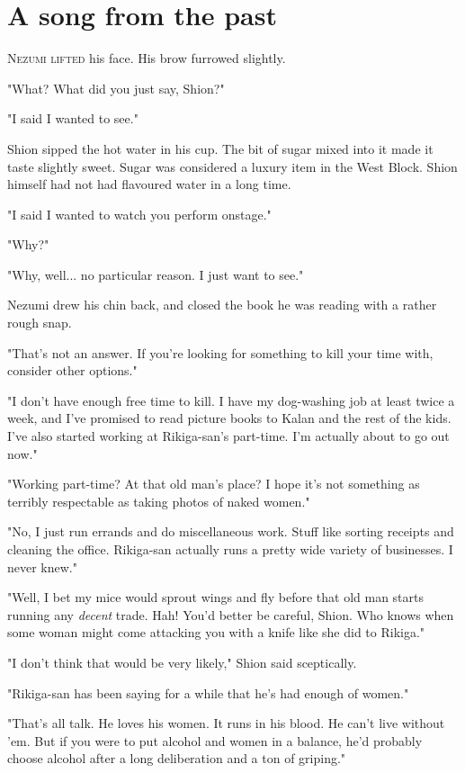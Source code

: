 
\chapter{A song from the past}

\lettrine{N}{ezumi lifted} his face. His brow furrowed slightly.

"What? What did you just say, Shion?"

"I said I wanted to see."

Shion sipped the hot water in his cup. The bit of sugar mixed into it
made it taste slightly sweet. Sugar was considered a luxury item in the
West Block. Shion himself had not had flavoured water in a long time.

"I said I wanted to watch you perform onstage."

"Why?"

"Why, well... no particular reason. I just want to see."

Nezumi drew his chin back, and closed the book he was reading with a
rather rough snap.

"That's not an answer. If you're looking for something to kill your time
with, consider other options."

"I don't have enough free time to kill. I have my dog-washing job at
least twice a week, and I've promised to read picture books to Kalan and
the rest of the kids. I've also started working at Rikiga-san's
part-time. I'm actually about to go out now."

"Working part-time? At that old man's place? I hope it's not something
as terribly respectable as taking photos of naked women."

"No, I just run errands and do miscellaneous work. Stuff like sorting
receipts and cleaning the office. Rikiga-san actually runs a pretty wide
variety of businesses. I never knew."

"Well, I bet my mice would sprout wings and fly before that old man
starts running any \emph{decent} trade. Hah! You'd better be careful, Shion.
Who knows when some woman might come attacking you with a knife like she
did to Rikiga."

"I don't think that would be very likely," Shion said sceptically.~

"Rikiga-san has been saying for a while that he's had enough of women."

"That's all talk. He loves his women. It runs in his blood. He can't
live without 'em. But if you were to put alcohol and women in a balance,
he'd probably choose alcohol after a long deliberation and a ton of
griping."

